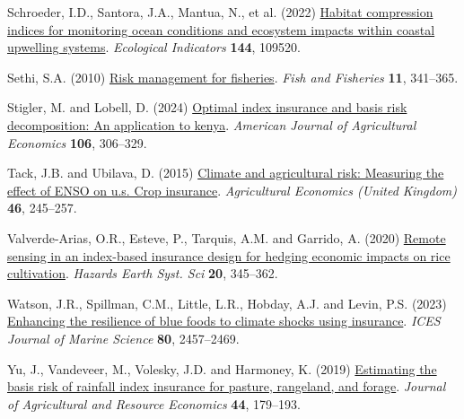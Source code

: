 \documentclass[
  letterpaper,
  DIV=11,
  numbers=noendperiod]{scrartcl}
\newlength{\cslhangindent}
\newlength{\cslentryspacingunit} %
\newenvironment{CSLReferences}[2] %
 {%
  \setlength{\parindent}{0pt}
  \ifodd #1
  \let\oldpar\par
  \def\par{\hangindent=\cslhangindent\oldpar}
  \fi
  \setlength{\parskip}{#2\cslentryspacingunit}
 }%
 {}
\begin{document}
\begin{CSLReferences}{1}{0}
\leavevmode{}%
Schroeder, I.D., Santora, J.A., Mantua, N., et al. (2022)
\href{https://doi.org/10.1016/j.ecolind.2022.109520}{Habitat compression
indices for monitoring ocean conditions and ecosystem impacts within
coastal upwelling systems}. \emph{Ecological Indicators} \textbf{144},
109520.

\leavevmode{}%
Sethi, S.A. (2010)
\href{https://doi.org/10.1111/j.1467-2979.2010.00363.x}{Risk management
for fisheries}. \emph{Fish and Fisheries} \textbf{11}, 341--365.

\leavevmode{}%
Stigler, M. and Lobell, D. (2024)
\href{https://doi.org/10.1111/ajae.12375}{Optimal index insurance and
basis risk decomposition: An application to kenya}. \emph{American
Journal of Agricultural Economics} \textbf{106}, 306--329.

\leavevmode{}%
Tack, J.B. and Ubilava, D. (2015)
\href{https://doi.org/10.1111/agec.12154}{Climate and agricultural risk:
Measuring the effect of ENSO on u.s. Crop insurance}. \emph{Agricultural
Economics (United Kingdom)} \textbf{46}, 245--257.

\leavevmode{}%
Valverde-Arias, O.R., Esteve, P., Tarquis, A.M. and Garrido, A. (2020)
\href{https://doi.org/10.5194/nhess-20-345-2020}{Remote sensing in an
index-based insurance design for hedging economic impacts on rice
cultivation}. \emph{Hazards Earth Syst. Sci} \textbf{20}, 345--362.

\leavevmode{}%
Watson, J.R., Spillman, C.M., Little, L.R., Hobday, A.J. and Levin, P.S.
(2023) \href{https://doi.org/10.1093/icesjms/fsad175}{Enhancing the
resilience of blue foods to climate shocks using insurance}. \emph{ICES
Journal of Marine Science} \textbf{80}, 2457--2469.

\leavevmode{}%
Yu, J., Vandeveer, M., Volesky, J.D. and Harmoney, K. (2019)
\href{https://doi.org/10.22004/ag.econ.281319}{Estimating the basis risk
of rainfall index insurance for pasture, rangeland, and forage}.
\emph{Journal of Agricultural and Resource Economics} \textbf{44},
179--193.

\end{CSLReferences}
\end{document}
